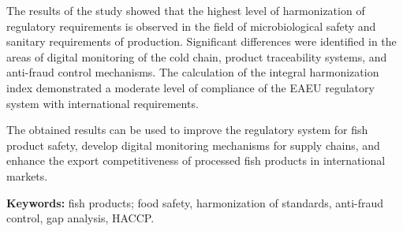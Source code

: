 The results of the study showed that the highest level of harmonization
of regulatory requirements is observed in the field of microbiological
safety and sanitary requirements of production. Significant differences
were identified in the areas of digital monitoring of the cold chain,
product traceability systems, and anti-fraud control mechanisms. The
calculation of the integral harmonization index demonstrated a moderate
level of compliance of the EAEU regulatory system with international
requirements.

The obtained results can be used to improve the regulatory system for
fish product safety, develop digital monitoring mechanisms for supply
chains, and enhance the export competitiveness of processed fish
products in international markets.

{\bfseries Keywords:} fish products; food safety, harmonization of
standards, anti-fraud control, gap analysis, HACCP.

